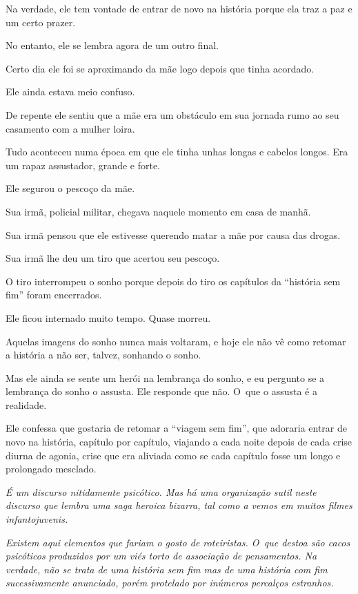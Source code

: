 Na verdade, ele tem vontade de entrar de novo na história porque ela traz
a paz e um certo prazer.

No entanto, ele se lembra agora de um outro final.

Certo dia ele foi se aproximando da mãe logo depois que tinha acordado.

Ele ainda estava meio confuso.

De repente ele sentiu que a mãe era um obstáculo em sua jornada rumo ao
seu casamento com a mulher loira.

Tudo aconteceu numa época em que ele tinha unhas longas e cabelos
longos. Era um rapaz assustador, grande e forte.

Ele segurou o pescoço da mãe.

Sua irmã, policial militar, chegava naquele momento em casa de manhã.

Sua irmã pensou que ele estivesse querendo matar a mãe por causa das
drogas.

Sua irmã lhe deu um tiro que acertou seu pescoço.

O tiro interrompeu o sonho porque depois do tiro os capítulos da
``história sem fim'' foram encerrados.

Ele ficou internado muito tempo. Quase morreu.

Aquelas imagens do sonho nunca mais voltaram, e hoje ele não vê como
retomar a história a não ser, talvez, sonhando o sonho.

Mas ele ainda se sente um herói na lembrança do sonho, e eu pergunto se
a lembrança do sonho o assusta. Ele responde que não. O~que o assusta é
a realidade.

Ele confessa que gostaria de retomar a ``viagem sem fim'', que adoraria
entrar de novo na história, capítulo por capítulo, viajando a cada noite
depois de cada crise diurna de agonia, crise que era aliviada como se
cada capítulo fosse um longo e prolongado mesclado.

\begin{center}\asterisc{}\end{center}
\begingroup\small

\emph{É um discurso nitidamente psicótico. Mas há uma organização sutil
neste discurso que lembra uma saga heroica bizarra, tal como a vemos em
muitos filmes infantojuvenis.}

\emph{Existem aqui elementos que fariam o gosto de roteiristas. O~que
destoa são cacos psicóticos produzidos por um viés torto de associação
de pensamentos. Na verdade, não se trata de uma história sem fim mas de
uma história com fim sucessivamente anunciado, porém protelado por
inúmeros percalços estranhos.}

